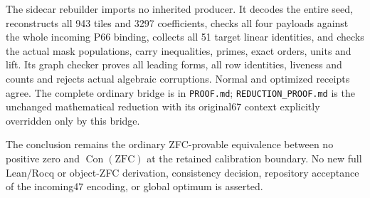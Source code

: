 The sidecar rebuilder imports no inherited producer. It decodes the entire
seed, reconstructs all 943 tiles and 3297 coefficients, checks all four payloads
against the whole incoming P66 binding, collects all 51 target linear identities,
and checks the actual mask populations, carry inequalities, primes, exact orders,
units and lift. Its graph checker proves all leading forms, all row identities,
liveness and counts and rejects actual algebraic corruptions. Normal and optimized
receipts agree. The complete ordinary bridge is in \texttt{PROOF.md};
\texttt{REDUCTION\_PROOF.md} is the unchanged mathematical reduction with its
original67 context explicitly overridden only by this bridge.

The conclusion remains the ordinary ZFC-provable equivalence between no positive
zero and $\operatorname{Con}(\mathrm{ZFC})$ at the retained calibration boundary.
No new full Lean/Rocq or object-ZFC derivation, consistency decision, repository
acceptance of the incoming47 encoding, or global optimum is asserted.
